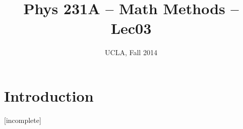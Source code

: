 \documentclass[12pt]{article} %
\title{Phys 231A -- Math Methods -- Lec03}
\author{UCLA, Fall 2014}
\date{\formatdate{09}{10}{2014}} %
\begin{document}
\setlength{\unitlength}{1mm}
\maketitle


\section{Introduction}

[incomplete]
\end{document}

